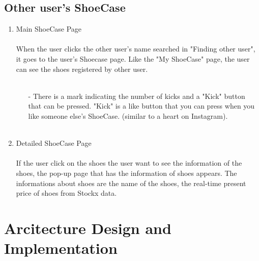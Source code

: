 \documentclass[conference]{IEEEtran}
\begin{document}
\subsection{Other user's ShoeCase}
\begin{enumerate}
	\item Main ShoeCase Page\\
\\When the user clicks the other user's name searched in "Finding other user", it goes to the user's Shoecase page. Like the "My ShoeCase" page, the user can see the shoes registered by other user.\\\\
	\begin{enumerate}
		\item[-]There is a mark indicating the number of kicks and a "Kick" button that can be pressed. "Kick" is a like button that you can press when you like someone else's ShoeCase. (similar to a heart on Instagram). \\\\
	\end{enumerate}
	\item Detailed ShoeCase Page\\
\\If the user click on the shoes the user want to see the information of the shoes, the pop-up page that has the information of shoes appears. The informations about shoes are the name of the shoes, the real-time present price of shoes from Stockx data.\\
\end{enumerate}
\section{Arcitecture Design and Implementation}
\end{document}
